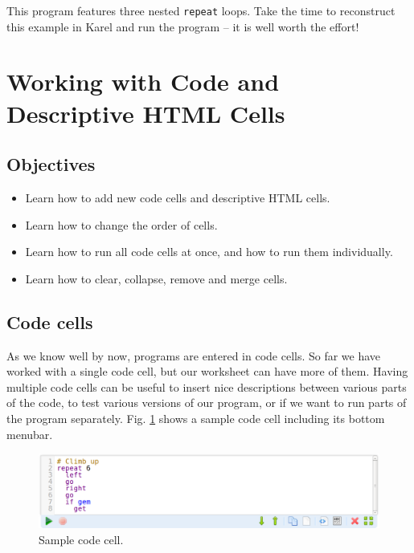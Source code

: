 \noindent
This program features three nested {\tt repeat} loops. Take the time to 
reconstruct this example in Karel and run the program -- it is well worth the effort!

\section{Working with Code and Descriptive HTML Cells} \label{sec:editmenu}

\subsection{Objectives} 
 
\begin{itemize}
\item Learn how to add new code cells and descriptive HTML cells.
\item Learn how to change the order of cells.
\item Learn how to run all code cells at once, and how to run them individually.
\item Learn how to clear, collapse, remove and merge cells.
\end{itemize}

\subsection{Code cells}

As we know well by now, programs are entered in code cells. So far we have worked with 
a single code cell, but our worksheet can have more of them. 
Having multiple code cells can be useful to insert nice descriptions 
between various parts of the code, to test various versions 
of our program, or if we want to run parts of the program separately. Fig. 
\ref{fig:menu-111} shows a sample code cell including its bottom menubar. 

\begin{figure}[!ht]
\begin{center}
\includegraphics[width=16cm]{img/menu-114.png}
\caption{Sample code cell.}
\label{fig:menu-111}
\end{center}
\end{figure}

